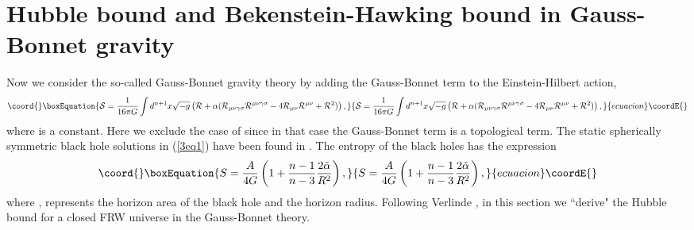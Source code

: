 \documentclass[a4paper,12pt]{article}
\providecommand{\sect}[1]{\setcounter{equation}{0}\section{#1}}
\begin{document}
\sect{Hubble bound and Bekenstein-Hawking bound in Gauss-Bonnet gravity}

Now we consider the so-called Gauss-Bonnet gravity theory by adding the Gauss-Bonnet
term to the Einstein-Hilbert action,
\begin{equation}\coord{}\boxEquation{
\label{3eq1}
{\cal S} =\frac{1}{16\pi G}\int d^{n+1}x\sqrt{-g} \left ({\cal R}
    +\alpha ({\cal R}_{\mu\nu\gamma\sigma}
{\cal R}^{\mu\nu\gamma\sigma} -4 {\cal R}_{\mu\nu}{\cal R}^{\mu\nu} +{\cal R}^2)\right ),
}{
{\cal S} =\frac{1}{16\pi G}\int d^{n+1}x\sqrt{-g} \left ({\cal R}
    +\alpha ({\cal R}_{\mu\nu\gamma\sigma}
{\cal R}^{\mu\nu\gamma\sigma} -4 {\cal R}_{\mu\nu}{\cal R}^{\mu\nu} +{\cal R}^2)\right ),
}{ecuacion}\coordE{}\end{equation}
where \myHighlight{$\alpha $}\coordHE{} is a  constant. Here we exclude the case of \coordHE{} since in that case the
Gauss-Bonnet term is a topological term. The static spherically symmetric black hole solutions
in (\ref{3eq1}) have been found in \cite{Deser,Whee}. The entropy of the black holes
has the expression~\cite{Myers,Cai}
\begin{equation}\coord{}\boxEquation{
\label{3eq2}
S =\frac{A}{4G}\left ( 1 +\frac{n-1}{n-3}\frac{2\tilde \alpha }{R^2}\right),
}{
S =\frac{A}{4G}\left ( 1 +\frac{n-1}{n-3}\frac{2\tilde \alpha }{R^2}\right),
}{ecuacion}\coordE{}\end{equation}
where \coordHE{}, \coordHE{} represents the horizon area of the black hole
and \coordHE{} the horizon radius. Following Verlinde \cite{Verl}, in this section
we  ``derive" the Hubble bound for a closed FRW universe in the Gauss-Bonnet theory.
\end{document}

